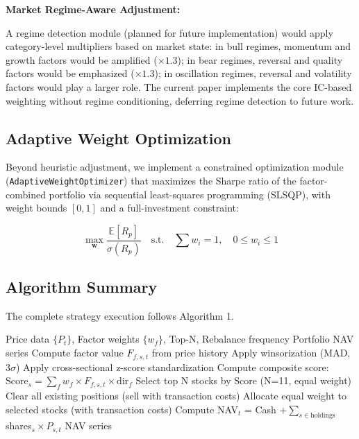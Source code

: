 \documentclass[12pt]{article}
\begin{document}
\textbf{Market Regime-Aware Adjustment:}

A regime detection module (planned for future implementation) would apply category-level multipliers based on market state: in bull regimes, momentum and growth factors would be amplified ($\times 1.3$); in bear regimes, reversal and quality factors would be emphasized ($\times 1.3$); in oscillation regimes, reversal and volatility factors would play a larger role. The current paper implements the core IC-based weighting without regime conditioning, deferring regime detection to future work.

\subsection{Adaptive Weight Optimization}

Beyond heuristic adjustment, we implement a constrained optimization module (\texttt{AdaptiveWeightOptimizer}) that maximizes the Sharpe ratio of the factor-combined portfolio via sequential least-squares programming (SLSQP), with weight bounds $[0, 1]$ and a full-investment constraint:

\begin{equation}
\max_{\mathbf{w}} \frac{\mathbb{E}[R_p]}{\sigma(R_p)} \quad \text{s.t.} \quad \sum w_i = 1, \quad 0 \leq w_i \leq 1
\end{equation}

\subsection{Algorithm Summary}

The complete strategy execution follows Algorithm 1.

\begin{algorithm}[h]
\caption{IC-Weighted Multi-Factor Strategy}
\begin{algorithmic}[1]
\REQUIRE Price data $\{P_t\}$, Factor weights $\{w_f\}$, Top-N, Rebalance frequency
\ENSURE Portfolio NAV series
                \STATE Compute factor value $F_{f,s,t}$ from price history
                \STATE Apply winsorization (MAD, $3\sigma$)
                \STATE Apply cross-sectional z-score standardization
            \ENDFOR
            \STATE Compute composite score: $\text{Score}_s = \sum_f w_f \times F_{f,s,t} \times \text{dir}_f$
        \ENDFOR
        \STATE Select top N stocks by Score (N=11, equal weight)
        \STATE Clear all existing positions (sell with transaction costs)
        \STATE Allocate equal weight to selected stocks (with transaction costs)
    \ENDIF
    \STATE Compute NAV$_t$ = Cash $+ \sum_{s \in \text{holdings}}$ shares$_s \times P_{s,t}$
\ENDFOR
\RETURN NAV series
\end{algorithmic}
\end{algorithm}
\end{document}
